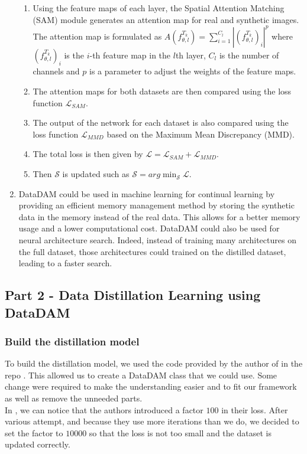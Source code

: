 \documentclass[onecolumn]{IEEEtran}
\begin{document}
\begin{enumerate}[label=(\alph*)]
\begin{enumerate}[label=(\arabic*)]
        \item Using the feature maps of each layer, the Spatial Attention Matching (SAM) module generates an attention map for real and synthetic images. The attention map is formulated as $A(f_{\theta,l}^{T_k}) = \sum_{i=1}^{C_l} | (f_{\theta,l}^{T_k})_i|^p$ where $(f_{\theta,l}^{T_k})_i$ is the $i$-th feature map in the $l$th layer, $C_l$ is the number of channels and $p$ is a parameter to adjust the weights of the feature maps.
        \item The attention maps for both datasets are then compared using the loss function $\mathcal{L}_{SAM}$.
        \item The output of the network for each dataset is also compared using the loss function $\mathcal{L}_{MMD}$ based on the Maximum Mean Discrepancy (MMD).
        \item The total loss is then given by $\mathcal{L} = \mathcal{L}_{SAM} + \mathcal{L}_{MMD}$.
        \item Then $\mathcal{S}$ is updated such as $\mathcal{S} = arg \min_{\mathcal{S}} \mathcal{L}$.
    \end{enumerate}
    \vspace{3mm}
    \item DataDAM could be used in machine learning for continual learning by providing an efficient memory management method by storing the synthetic data in the memory instead of the real data. This allows for a better memory usage and a lower computational cost. DataDAM could also be used for neural architecture search. Indeed, instead of training many architectures on the full dataset, those architectures could trained on the distilled dataset, leading to a faster search.
\end{enumerate}

\subsection{Part 2 - Data Distillation Learning using DataDAM}
\subsubsection{Build the distillation model}
To build the distillation model, we used the code provided by the author of \cite{sajedi2023datadam} in the repo \cite{githubGitHubDataDistillationDataDAM}. This allowed us to create a DataDAM class that we could use. Some change were required to make the understanding easier and to fit our framework as well as remove the unneeded parts.
\\
In \cite{githubGitHubDataDistillationDataDAM}, we can notice that the authors introduced a factor $100$ in their loss. After various attempt, and because they use more iterations than we do, we decided to set the factor to $10 000$ so that the loss is not too small and the dataset is updated correctly.
\end{document}
